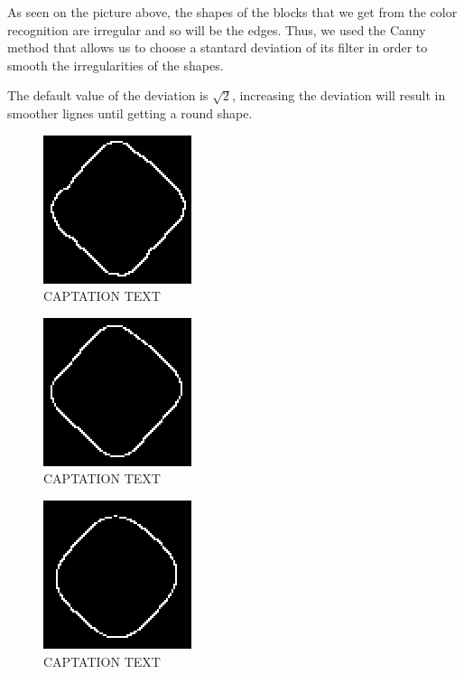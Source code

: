  \begin{flushleft}
As seen on the picture above, the shapes of the blocks that we get from the color recognition are irregular and so will be the edges. Thus, we used the Canny method that allows us to choose a stantard deviation of its filter in order to smooth the irregularities of the shapes.\par 
 \end{flushleft}

\begin{flushleft}
The default value of the deviation is $\sqrt{2}$, increasing the deviation will result in smoother lignes until getting a round shape.
\end{flushleft}

	\begin{figure}[hb]
  \centering
  \includegraphics[scale=0.5]{figures/Canny_sqrt2.png}
  \caption[LABEL] {CAPTATION TEXT}
\end{figure}	
  	\begin{figure}[hb]
  \centering
  \includegraphics[scale=0.5]{figures/Canny_4.png}
  \caption[LABEL] {CAPTATION TEXT}
\end{figure}	
  	\begin{figure}[hb]
  \centering
  \includegraphics[scale=0.5]{figures/Canny_10.png}
  \caption[LABEL] {CAPTATION TEXT}
\end{figure}	
